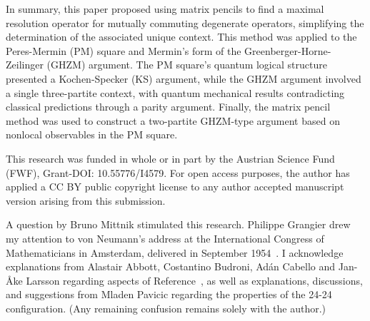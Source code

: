 \documentclass[
  twocolumn,
 showpacs,
 showkeys,
 preprintnumbers,
 amsmath,amssymb,
 aps,
 pra,
  longbibliography,
 floatfix,
 ]{revtex4-2}
\begin{document}
In summary, this paper proposed using matrix pencils to find a maximal resolution operator for mutually commuting degenerate operators, simplifying the determination of the associated unique context. This method was applied to the Peres-Mermin (PM) square and Mermin's form of the Greenberger-Horne-Zeilinger (GHZM) argument. The PM square's quantum logical structure presented a Kochen-Specker (KS) argument, while the GHZM argument involved a single three-partite context, with quantum mechanical results contradicting classical predictions through a parity argument. Finally, the matrix pencil method was used to construct a two-partite GHZM-type argument based on nonlocal observables in the PM square.

\begin{acknowledgments}

This research was funded in whole or in part by the Austrian Science Fund (FWF), Grant-DOI: 10.55776/I4579. For open access purposes, the author has applied a CC BY public copyright license to any author accepted manuscript version arising from this submission.

A question by Bruno Mittnik stimulated this research.
Philippe Grangier drew my attention to von Neumann's address at the International Congress of Mathematicians in Amsterdam, delivered in September 1954~\cite{vonNeumann2001}.
I acknowledge explanations from Alastair Abbott, Costantino Budroni, Ad\'an Cabello and Jan-\AA{}ke Larsson regarding aspects of Reference~\cite{cabello2021contextuality},
as well as explanations, discussions, and suggestions from Mladen Pavicic regarding the properties of the 24-24 configuration.
(Any remaining confusion remains solely with the author.)
\end{acknowledgments}




%
\end{document}
